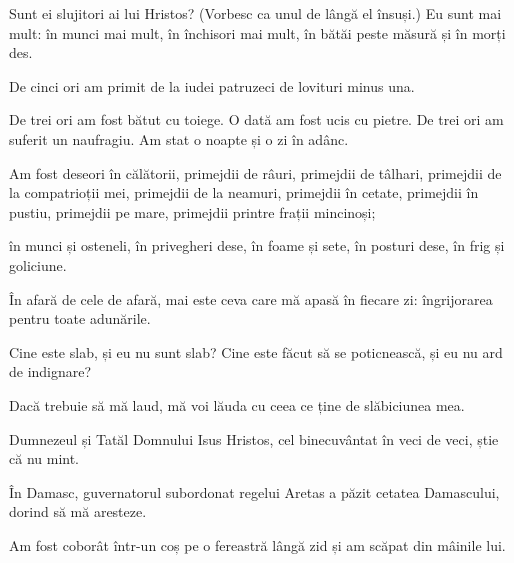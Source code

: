 {Sunt ei slujitori ai lui Hristos? (Vorbesc ca unul de lângă el însuși.) Eu sunt mai mult: în munci mai mult, în închisori mai mult, în bătăi peste măsură și în morți des.

De cinci ori am primit de la iudei patruzeci de lovituri minus una.

De trei ori am fost bătut cu toiege. O dată am fost ucis cu pietre. De trei ori am suferit un naufragiu. Am stat o noapte și o zi în adânc.

Am fost deseori în călătorii, primejdii de râuri, primejdii de tâlhari, primejdii de la compatrioții mei, primejdii de la neamuri, primejdii în cetate, primejdii în pustiu, primejdii pe mare, primejdii printre frații mincinoși;

în munci și osteneli, în privegheri dese, în foame și sete, în posturi dese, în frig și goliciune.


\par }{\PP {}În afară de cele de afară, mai este ceva care mă apasă în fiecare zi: îngrijorarea pentru toate adunările.

Cine este slab, și eu nu sunt slab? Cine este făcut să se poticnească, și eu nu ard de indignare?


\par }{\PP {}Dacă trebuie să mă laud, mă voi lăuda cu ceea ce ține de slăbiciunea mea.

Dumnezeul și Tatăl Domnului Isus Hristos, cel binecuvântat în veci de veci, știe că nu mint.

În Damasc, guvernatorul subordonat regelui Aretas a păzit cetatea Damascului, dorind să mă aresteze.

Am fost coborât într-un coș pe o fereastră lângă zid și am scăpat din mâinile lui.



\par }
